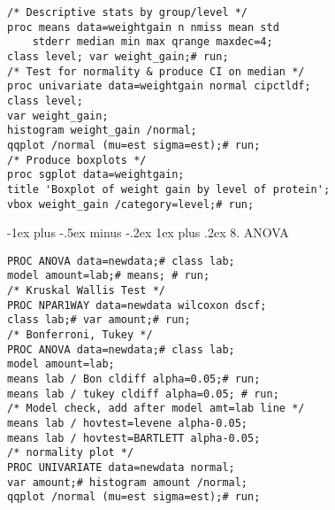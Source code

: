 \documentclass[10pt,landscape,letterpaper]{article}
\makeatletter
\renewcommand{\subsubsection}{\@startsection{subsubsection}{3}{0mm}%
                                {-1ex plus -.5ex minus -.2ex}%
                                {1ex plus .2ex}%
                                {\normalfont\small\itshape}}
\makeatother
\begin{document}
\begin{multicols}{3}
\begin{verbatim}
/* Descriptive stats by group/level */
proc means data=weightgain n nmiss mean std
    stderr median min max qrange maxdec=4;
class level; var weight_gain;# run;
/* Test for normality & produce CI on median */
proc univariate data=weightgain normal cipctldf;
class level;
var weight_gain;
histogram weight_gain /normal;
qqplot /normal (mu=est sigma=est);# run;
/* Produce boxplots */
proc sgplot data=weightgain;
title 'Boxplot of weight gain by level of protein';
vbox weight_gain /category=level;# run;
\end{verbatim}

\subsubsection{8. ANOVA}
\begin{verbatim}
PROC ANOVA data=newdata;# class lab;
model amount=lab;# means; # run;
/* Kruskal Wallis Test */
PROC NPAR1WAY data=newdata wilcoxon dscf;
class lab;# var amount;# run;
/* Bonferroni, Tukey */
PROC ANOVA data=newdata;# class lab;
model amount=lab;
means lab / Bon cldiff alpha=0.05;# run;
means lab / tukey cldiff alpha=0.05; # run;
/* Model check, add after model amt=lab line */
means lab / hovtest=levene alpha-0.05;
means lab / hovtest=BARTLETT alpha-0.05;
/* normality plot */
PROC UNIVARIATE data=newdata normal;
var amount;# histogram amount /normal;
qqplot /normal (mu=est sigma=est);# run;
\end{verbatim}


\end{multicols}
\end{document}
